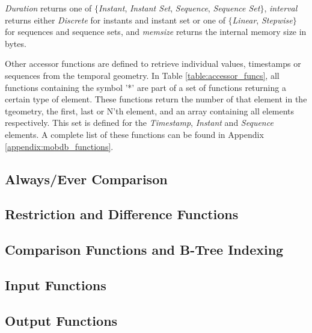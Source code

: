 \textit{Duration} returns one of $\{$\textit{Instant}, \textit{Instant Set}, \textit{Sequence}, \textit{Sequence Set}$\}$, \textit{interval} returns either \textit{Discrete} for instants and instant set or one of $\{$\textit{Linear}, \textit{Stepwise}$\}$ for sequences and sequence sets, and \textit{memsize} returns the internal memory size in bytes.

Other accessor functions are defined to retrieve individual values, timestamps or sequences from the temporal geometry. In Table \ref{table:accessor_funcs}, all functions containing the symbol '*' are part of a set of functions returning a certain type of element. These functions return the number of that element in the tgeometry, the first, last or N'th element, and an array containing all elements respectively. This set is defined for the \textit{Timestamp}, \textit{Instant} and \textit{Sequence} elements. A complete list of these functions can be found in Appendix \ref{appendix:mobdb_functions}.

\subsection{Always/Ever Comparison}
\label{section:always_ever}

\subsection{Restriction and Difference Functions}
\label{section:restriction_and_difference}

\subsection{Comparison Functions and B-Tree Indexing}
\label{section:comparison_b_tree}

\subsection{Input Functions}
\label{section:input_funcs}

\subsection{Output Functions}
\label{section:output_funcs}


